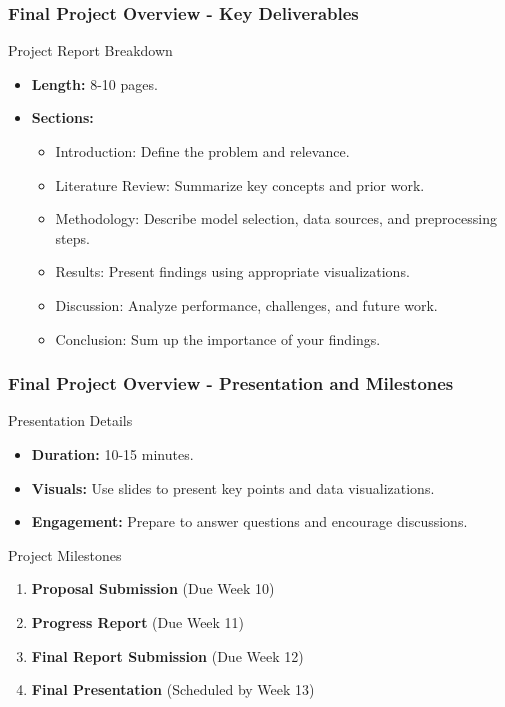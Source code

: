 \documentclass[aspectratio=169]{beamer}
\begin{document}
\begin{frame}[fragile]
    \frametitle{Final Project Overview - Key Deliverables}
    \begin{block}{Project Report Breakdown}
        \begin{itemize}
            \item \textbf{Length:} 8-10 pages.
            \item \textbf{Sections:}
            \begin{itemize}
                \item Introduction: Define the problem and relevance.
                \item Literature Review: Summarize key concepts and prior work.
                \item Methodology: Describe model selection, data sources, and preprocessing steps.
                \item Results: Present findings using appropriate visualizations.
                \item Discussion: Analyze performance, challenges, and future work.
                \item Conclusion: Sum up the importance of your findings.
            \end{itemize}
        \end{itemize}
    \end{block}
\end{frame}

\begin{frame}[fragile]
    \frametitle{Final Project Overview - Presentation and Milestones}
    \begin{block}{Presentation Details}
        \begin{itemize}
            \item \textbf{Duration:} 10-15 minutes.
            \item \textbf{Visuals:} Use slides to present key points and data visualizations.
            \item \textbf{Engagement:} Prepare to answer questions and encourage discussions.
        \end{itemize}
    \end{block}
    
    \begin{block}{Project Milestones}
        \begin{enumerate}
            \item \textbf{Proposal Submission} (Due Week 10)
            \item \textbf{Progress Report} (Due Week 11)
            \item \textbf{Final Report Submission} (Due Week 12)
            \item \textbf{Final Presentation} (Scheduled by Week 13)
        \end{enumerate}
    \end{block}
\end{frame}
\end{document}
